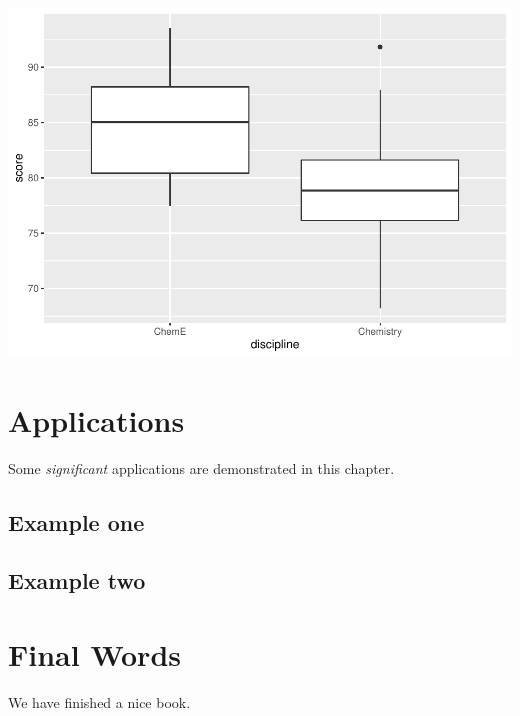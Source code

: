 \documentclass[
]{book}
\begin{document}
\includegraphics{test_course_notes_files/figure-latex/unnamed-chunk-38-1.pdf}

\hypertarget{applications}{%
\chapter{Applications}\label{applications}}

Some \emph{significant} applications are demonstrated in this chapter.

\hypertarget{example-one}{%
\section{Example one}\label{example-one}}

\hypertarget{example-two}{%
\section{Example two}\label{example-two}}

\hypertarget{final-words}{%
\chapter{Final Words}\label{final-words}}

We have finished a nice book.

  
\end{document}

